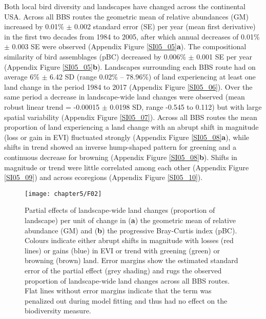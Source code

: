 Both local bird diversity and landscapes have changed across the continental USA. Across all BBS routes the geometric mean of relative abundances (GM) increased by 0.01\% $\pm$ 0.002 standard error (SE) per year (mean first derivative) in the first two decades from 1984 to 2005, after which annual decreases of 0.01\% $\pm$ 0.003 SE were observed (Appendix Figure \ref{SI05_05}\textbf{a}). The compositional similarity of bird assemblages (pBC) decreased by 0.006\% $\pm$ 0.001 SE per year (Appendix Figure \ref{SI05_05}\textbf{b}). Landscapes surrounding each BBS route had on average 6\% $\pm$ 6.42 SD (range 0.02\% – 78.96\%) of land experiencing at least one land change in the period 1984 to 2017 (Appendix Figure \ref{SI05_06}). Over the same period a decrease in landscape-wide land changes were observed (mean robust linear trend = -0.00015 $\pm$ 0.0198 SD, range -0.545 to 0.112) but with large spatial variability (Appendix Figure \ref{SI05_07}). Across all BBS routes the mean proportion of land experiencing a land change with an abrupt shift in magnitude (loss or gain in EVI) fluctuated strongly (Appendix Figure \ref{SI05_08}\textbf{a}), while shifts in trend showed an inverse hump-shaped pattern for greening and a continuous decrease for browning (Appendix Figure \ref{SI05_08}\textbf{b}). Shifts in magnitude or trend were little correlated among each other (Appendix Figure \ref{SI05_09}) and across ecoregions (Appendix Figure \ref{SI05_10}).

\begin{figure}[htb]
\centering
\texttt{[image: chapter5/F02]}
\caption{ Partial effects of landscape-wide land changes (proportion of landscape) per unit of change in (\textbf{a}) the geometric mean of relative abundance (GM) and (\textbf{b}) the progressive Bray-Curtis index (pBC). Colours indicate either abrupt shifts in magnitude with losses (red lines) or gains (blue) in EVI or trend with greening (green) or browning (brown) land. Error margins show the estimated standard error of the partial effect (grey shading) and rugs the observed proportion of landscape-wide land changes across all BBS routes. Flat lines without error margins indicate that the term was penalized out during model fitting and thus had no effect on the biodiversity measure. }
\label{F05_02}
\end{figure}

